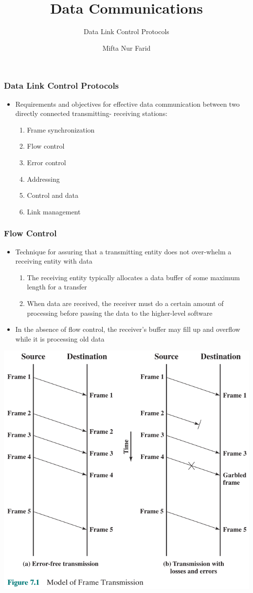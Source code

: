 \documentclass[pdflatex,compress]{beamer}
\title{Data Communications}
\subtitle{Data Link Control Protocols}
\author{Mifta Nur Farid}
\begin{document}
\maketitle

\begin{frame}
	\frametitle{Data Link Control Protocols}
	\begin{itemize}
		\item Requirements and objectives for effective data 		communication between two directly connected transmitting-		receiving stations:
		\begin{enumerate}
			\item Frame synchronization
			\item Flow control
			\item Error control
			\item Addressing
			\item Control and data
			\item Link management
		\end{enumerate}
	\end{itemize}
\end{frame}

\begin{frame}
	\frametitle{Flow Control}
	\begin{itemize}
		\item Technique for assuring that a transmitting entity does not over-whelm a receiving entity with data
		\begin{enumerate}
			\item The receiving entity typically allocates a data buffer of some maximum length for a transfer
			\item When data are received, the receiver must do a certain amount of processing before passing the data to the higher-level software
		\end{enumerate}
		\item In the absence of flow control, the receiver’s buffer may fill up and overflow while it is processing old data
	\end{itemize}
\end{frame}

\begin{frame}
	\begin{center}
		\includegraphics[width=0.6\linewidth]{img/img01}
	\end{center}
\end{frame}
\end{document}
